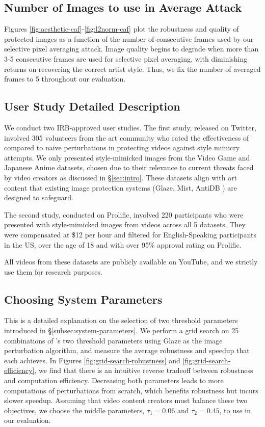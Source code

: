 \subsection{Number of Images to use in Average Attack}
\label{app:num-images-average}
Figures \ref{fig:aesthetic-caf}-\ref{fig:l2norm-caf} plot the robustness and quality of protected images as a function of the number of consecutive frames used by our selective pixel averaging attack. Image quality begins to degrade when more than 3-5 consecutive frames are used for selective pixel averaging, with diminishing returns on recovering the correct artist style. Thus, we fix the number of averaged frames to 5 throughout our evaluation.

\subsection{User Study Detailed Description}
\label{app:detailed-user-study}
We conduct two IRB-approved user studies. The first study, released on Twitter, involved 305 volunteers from the art community who rated the effectiveness of \system~ compared to naive perturbations in protecting videos against style mimicry attempts. We only presented style-mimicked images from the Video Game and Japanese Anime datasets, chosen due to their relevance to current threats faced by video creators as discussed in \S\ref{sec:intro}. These datasets align with art content that existing image protection systems (Glaze, Mist, AntiDB \cite{shan2023glaze,mist,antidb}) are designed to safeguard.

The second study, conducted on Prolific, involved 220 participants who were presented with style-mimicked images from videos across all 5 datasets. They were compensated at \$12 per hour and filtered for English-Speaking participants in the US, over the age of 18 and with over 95\% approval rating on Prolific.

All videos from these datasets are publicly available on YouTube, and we strictly use them for research purposes.

\subsection{Choosing System Parameters}
\label{app:system-parameters}
This is a detailed explanation on the selection of two threshold parameters introduced in \S\ref{subsec:system-parameters}. We perform a grid search on 25 combinations of \system's two threshold parameters using Glaze as the image perturbation algorithm, and measure the average robustness and speedup that each achieves. In Figures \ref{fig:grid-search-robustness} and \ref{fig:grid-search-efficiency}, we find that there is an intuitive reverse tradeoff between robustness and computation efficiency. Decreasing both parameters leads to more computations of perturbations from scratch, which benefits robustness but incurs slower speedup. Assuming that video content creators must balance these two objectives, we choose the middle parameters, $\tau_1 = 0.06$ and $\tau_2 = 0.45$, to use in our evaluation.


